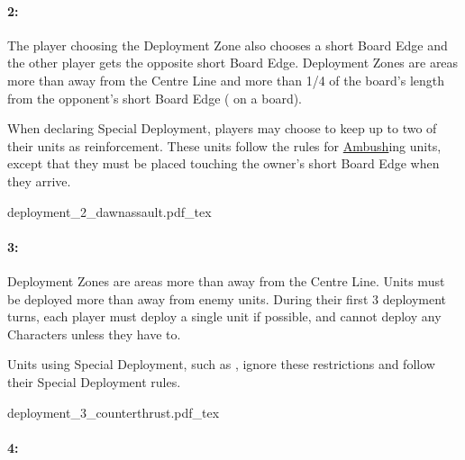 \hypertarget{dawn_assault}{\paragraph{2\spacebeforecolon{}: \dawnassault}}
\idx[main=y]{\dawnassault}

The player choosing the Deployment Zone also chooses a short Board Edge and the other player gets the opposite short Board Edge. Deployment Zones are areas more than  away from the Centre Line and more than 1/4 of the board's length from the opponent's short Board Edge ( on a  board).

When declaring Special Deployment, players may choose to keep up to two of their units as reinforcement. These units follow the rules for \hyperref[ambush]{Ambush}ing units, except that they must be placed touching the owner's short Board Edge when they arrive.

\begin{center}
	\def\svgwidth{0.42\textwidth}
	{deployment_2_dawnassault.pdf_tex}
\end{center}
\vspace{-3pt}

\hypertarget{counterthrust}{\paragraph{3\spacebeforecolon{}: \counterthrust}}
\idx[main=y]{\counterthrust}

Deployment Zones are areas more than  away from the Centre Line. Units must be deployed more than  away from enemy units. During their first 3 deployment turns, each player must deploy a single unit if possible, and cannot deploy any Characters unless they have to.

Units using Special Deployment, such as \hyperref[scout]{\scout}, ignore these restrictions and follow their Special Deployment rules.

\begin{center}
	\def\svgwidth{0.36\textwidth}
	{deployment_3_counterthrust.pdf_tex}
\end{center}
\vspace{-3pt}

\hypertarget{encircle}{\paragraph{4\spacebeforecolon{}: \encircle}}
\idx[main=y]{\encircle}

